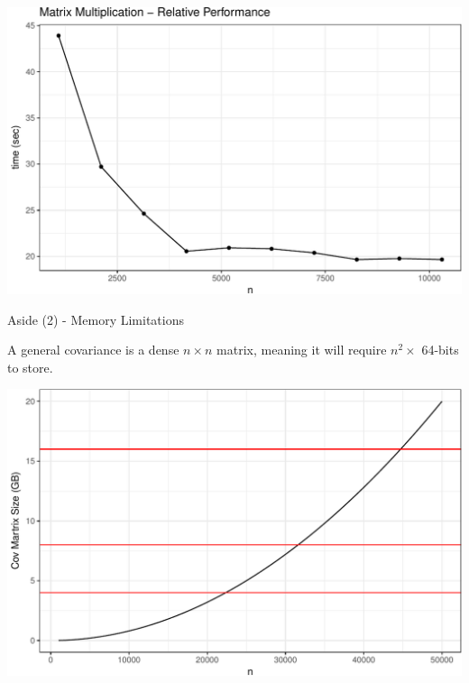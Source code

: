 \documentclass[11pt,ignorenonframetext,]{beamer}
\begin{document}
\begin{frame}{}
\protect\hypertarget{section-1}{}

\begin{center}\includegraphics[width=\textwidth]{Lec21_files/figure-beamer/unnamed-chunk-6-1} \end{center}

\end{frame}

\begin{frame}{Aside (2) - Memory Limitations}
\protect\hypertarget{aside-2---memory-limitations}{}

A general covariance is a dense \(n \times n\) matrix, meaning it will
require \(n^2 \times\) 64-bits to store.

\begin{center}\includegraphics[width=\textwidth]{Lec21_files/figure-beamer/unnamed-chunk-7-1} \end{center}

\end{frame}
\end{document}
